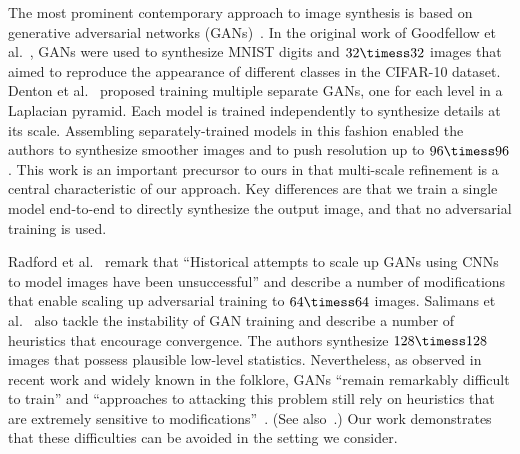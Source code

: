 The most prominent contemporary approach to image synthesis is based on generative adversarial networks (GANs)~\cite{Goodfellow2014}. In the original work of Goodfellow et al.~\cite{Goodfellow2014}, GANs were used to synthesize MNIST digits and $32\timess 32$ images that aimed to reproduce the appearance of different classes in the CIFAR-10 dataset. Denton et al.~\cite{Denton2015} proposed training multiple separate GANs, one for each level in a Laplacian pyramid. Each model is trained independently to synthesize details at its scale. Assembling separately-trained models in this fashion enabled the authors to synthesize smoother images and to push resolution up to $96\timess 96$.
This work is an important precursor to ours in that multi-scale refinement is a central characteristic of our approach. Key differences are that we train a single model end-to-end to directly synthesize the output image, and that no adversarial training is used.

Radford et al.~\cite{Radford2016} remark that ``Historical attempts to scale up GANs using CNNs to model images have been unsuccessful'' and describe a number of modifications that enable scaling up adversarial training to $64\timess 64$ images. Salimans et al.~\cite{Salimans2016} also tackle the instability of GAN training and describe a number of heuristics that encourage convergence. The authors synthesize $128\timess 128$ images that possess plausible low-level statistics.
Nevertheless, as observed in recent work and widely known in the folklore, GANs ``remain remarkably difficult to train'' and ``approaches to attacking this problem still rely on heuristics that are extremely sensitive to modifications''~\cite{ArjovskyBottou2017}. (See also~\cite{Metz2017}.) Our work demonstrates that these difficulties can be avoided in the setting we consider.

